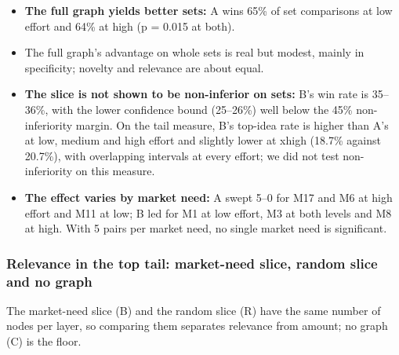\begin{itemize}
\tightlist
\item
  \textbf{The full graph yields better sets:} A wins 65\% of set comparisons at low effort and 64\% at high (p = 0.015 at both).
\item
  The full graph's advantage on whole sets is real but modest, mainly in specificity; novelty and relevance are about equal.
\item
  \textbf{The slice is not shown to be non-inferior on sets:} B's win rate is 35--36\%, with the lower confidence bound (25--26\%) well below the 45\% non-inferiority margin. On the tail measure, B's top-idea rate is higher than A's at low, medium and high effort and slightly lower at xhigh (18.7\% against 20.7\%), with overlapping intervals at every effort; we did not test non-inferiority on this measure.
\item
  \textbf{The effect varies by market need:} A swept 5--0 for M17 and M6 at high effort and M11 at low; B led for M1 at low effort, M3 at both levels and M8 at high. With 5 pairs per market need, no single market need is significant.
\end{itemize}



\hypertarget{relevance-top-tail}{%
\subsubsection{Relevance in the top tail: market-need slice, random slice and no graph}\label{relevance-top-tail}}
The market-need slice (B) and the random slice (R) have the same number of nodes per layer, so comparing them separates relevance from amount; no graph (C) is the floor.

